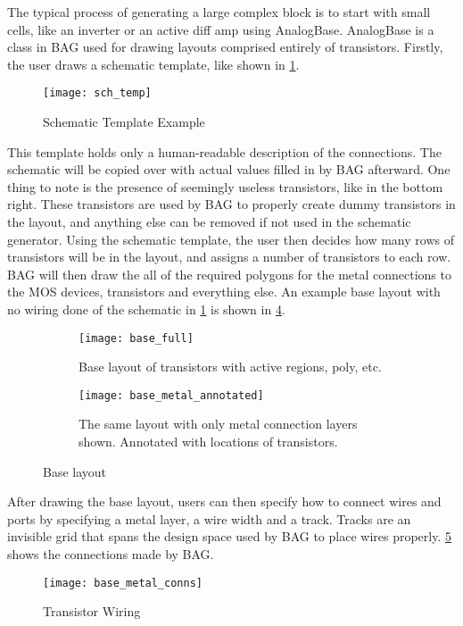 The typical process of generating a large complex block is to start with small cells, like an inverter or an active diff amp using AnalogBase. AnalogBase is a class in BAG used for drawing layouts comprised entirely of transistors. Firstly, the user draws a schematic template, like shown in \ref{fig:sch_templ}.
\begin{figure}[h]
\centering
\texttt{[image: sch\_temp]}
\caption{Schematic Template Example}
\label{fig:sch_templ}
\end{figure}
This template holds only a human-readable description of the connections. The schematic will be copied over with actual values filled in by BAG afterward. One thing to note is the presence of seemingly useless transistors, like in the bottom right. These transistors are used by BAG to properly create dummy transistors in the layout, and anything else can be removed if not used in the schematic generator. Using the schematic template, the user then decides how many rows of transistors will be in the layout, and assigns a number of transistors to each row. BAG will then draw the all of the required polygons for the metal connections to the MOS devices, transistors and everything else. An example base layout with no wiring done of the schematic in \ref{fig:sch_templ} is shown in \ref{fig:base_layout_metal}.
\begin{figure}[h]
\centering
\begin{subfigure}{.4\linewidth}
  \centering
  \texttt{[image: base\_full]}
  \caption{Base layout of transistors with active regions, poly, etc.}
  \label{fig:sfig1}
\end{subfigure}
\begin{subfigure}{.4\linewidth}
  \centering
\texttt{[image: base\_metal\_annotated]}
  \caption{The same layout with only metal connection layers shown. Annotated with locations of transistors.}
  \label{fig:sfig2}
\end{subfigure}
\caption{Base layout}
\label{fig:base_layout_metal}
\end{figure}
\clearpage
After drawing the base layout, users can then specify how to connect wires and ports by specifying a metal layer, a wire width and a track. Tracks are an invisible grid that spans the design space used by BAG to place wires properly. \ref{fig:base_with_wires} shows the connections made by BAG.
\begin{figure}[h]
\centering
\texttt{[image: base\_metal\_conns]}
\caption{Transistor Wiring}
\label{fig:base_with_wires}
\end{figure}
